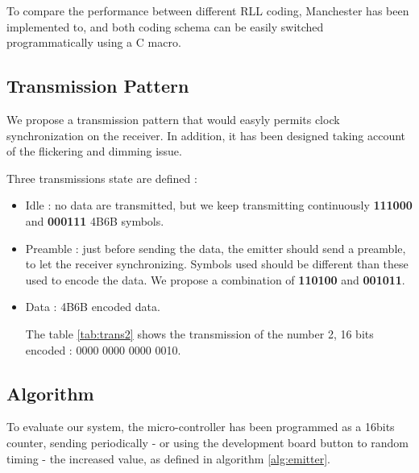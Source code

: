 To compare the performance between different RLL coding, Manchester has been implemented to, and both coding schema can be easily switched programmatically using a C macro.

\subsection{Transmission Pattern} \label{frame}

We propose a transmission pattern that would easyly permits clock synchronization on the receiver. In addition, it has been designed taking account of the flickering and dimming issue.

Three transmissions state are defined : 
\begin{itemize}
\item Idle : no data are transmitted, but we keep transmitting continuously \textbf{111000} and \textbf{000111} 4B6B symbols.
\item Preamble : just before sending the data, the emitter should send a preamble, to let the receiver synchronizing. Symbols used should be different than these used to encode the data. We propose a combination of \textbf{110100} and \textbf{001011}.
\item Data : 4B6B encoded data.

The table \ref{tab:trans2} shows the transmission of the number 2, 16 bits encoded : 0000 0000 0000 0010.

\begin{table}[htbp]
  \begin{center}
  \end{center}
  \caption{A transmission example : 2 (16-bits)}
  \label{tab:trans2}
\end{table}


\end{itemize}
\subsection{Algorithm}
To evaluate our system, the micro-controller has been programmed as a 16bits counter, sending periodically - or using the development board button to random timing - the increased value, as defined in algorithm \ref{alg:emitter}.

